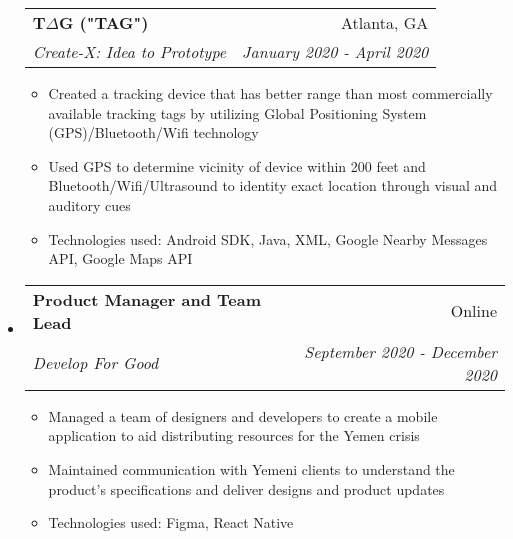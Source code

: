 \documentclass[letterpaper,10pt]{article}
\makeatletter
\newcommand{\resitem}[1]{\item #1 \vspace{-2pt}}
\newcommand{\ressubheading}[4]{
\begin{tabular*}{7.0in}{l@{\extracolsep{\fill}}r}
		\textbf{#1} & #2 \\
		\textit{#3} & \textit{#4} \\
\end{tabular*}\vspace{-6pt}}
\makeatother
\begin{document}
\begin{itemize}
    \ressubheading{T$\Delta$G ("TAG")}{Atlanta, GA}{Create-X: Idea to Prototype}{January 2020 - April 2020}
    \begin{itemize}
        \resitem{Created a tracking device that has better range than most commercially available tracking tags by utilizing Global Positioning System (GPS)/Bluetooth/Wifi technology}
        \resitem{Used GPS to determine vicinity of device within 200 feet and Bluetooth/Wifi/Ultrasound to identity exact location through visual and auditory cues}
        \resitem{Technologies used: Android SDK, Java, XML, Google Nearby Messages API, Google Maps API}
    \end{itemize}
\item
    \ressubheading{Product Manager and Team Lead}{Online}{Develop For Good}{September 2020 - December 2020}
    \begin{itemize}
        \resitem{Managed a team of designers and developers to create a mobile application to aid distributing resources for the Yemen crisis}
        \resitem{Maintained communication with Yemeni clients to understand the product's specifications and deliver designs and product updates}
        \resitem{Technologies used: Figma, React Native}
    \end{itemize}

\end{itemize}
\end{document}
